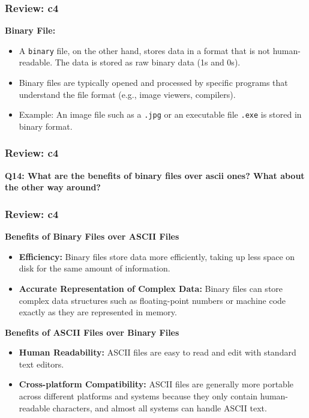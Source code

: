 \documentclass[
	11pt, %
]{beamer}
\begin{document}

\begin{frame}
	\frametitle{Review: c4}

    \textbf{Binary File:}
    \begin{itemize}
        \item A \texttt{binary} file, on the other hand, stores data in a format that is not human-readable. The data is stored as raw binary data (1s and 0s).
        \item Binary files are typically opened and processed by specific programs that understand the file format (e.g., image viewers, compilers).
        \item Example: An image file such as a \texttt{.jpg} or an executable file \texttt{.exe} is stored in binary format.
    \end{itemize}


\end{frame}



\begin{frame}
	\frametitle{Review: c4}

	\textbf{Q14: What are the benefits of binary files over ascii ones? What about the other way around?}

\end{frame}



\begin{frame}
	\frametitle{Review: c4}

    \textbf{Benefits of Binary Files over ASCII Files}

    \begin{itemize}
        \item \textbf{Efficiency:} Binary files store data more efficiently, taking up less space on disk for the same amount of information.
        \item \textbf{Accurate Representation of Complex Data:} Binary files can store complex data structures such as floating-point numbers or machine code exactly as they are represented in memory.
    \end{itemize}

\vspace{0.5cm}
    \textbf{Benefits of ASCII Files over Binary Files}

    \begin{itemize}
        \item \textbf{Human Readability:} ASCII files are easy to read and edit with standard text editors.
        
        \item \textbf{Cross-platform Compatibility:} ASCII files are generally more portable across different platforms and systems because they only contain human-readable characters, and almost all systems can handle ASCII text.
    \end{itemize}


\end{frame}
\end{document}

